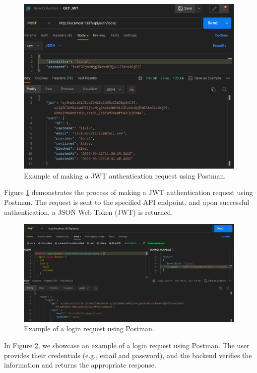 \begin{figure}[htbp]
  \centering
  \includegraphics[width=\textwidth]{Strapi/ExampleJWT Get Postman.png}
  \caption{Example of making a JWT authentication request using Postman.}
  \label{fig:example_jwt_postman}
\end{figure}

Figure \ref{fig:example_jwt_postman} demonstrates the process of making a JWT authentication request using Postman. The request is sent to the specified API endpoint, and upon successful authentication, a JSON Web Token (JWT) is returned.

\begin{figure}[htbp]
  \centering
  \includegraphics[width=\textwidth]{Strapi/Example of Login using PostMan.png}
  \caption{Example of a login request using Postman.}
  \label{fig:example_login_postman}
\end{figure}

In Figure \ref{fig:example_login_postman}, we showcase an example of a login request using Postman. The user provides their credentials (e.g., email and password), and the backend verifies the information and returns the appropriate response.

